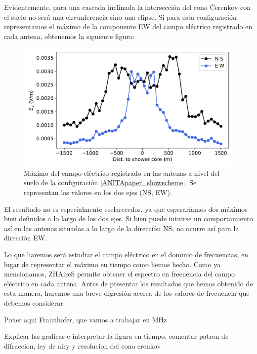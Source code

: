 \documentclass[12 pt, a4paper]{article} %
\numberwithin{equation}{section}
\numberwithin{figure}{section}
\begin{document}
Evidentemente, para una cascada inclinada la intersección del cono \v{C}erenkov con el suelo no será una circunferencia sino una elipse. Si para esta configuración representamos el máximo de la componente EW del campo eléctrico registrado en cada antena, obtenemos la siguiente figura:
\begin{figure}[H]
	\centering
	\includegraphics[width=.65\linewidth]{figures/radio/downgoing_p_10EeV_70deg_Ey_t_ground}
	\caption{Máximo del campo eléctrico registrado en las antenas a nivel del suelo de la configuración \ref{ANITApaper_showscheme}. Se representan los valores en los dos ejes (NS, EW).}
	\label{downgoing_p_10EeV_70deg_Ey_t_ground}
\end{figure}
El resultado no es especialmente esclarecedor, ya que esperaríamos dos máximos bien definidos a lo largo de los dos ejes. Si bien puede intuirse un comportamiento así en las antenas situadas a lo largo de la dirección NS, no ocurre así para la dirección EW.

Lo que haremos será estudiar el campo eléctrico en el dominio de frecuencias, en lugar de representar el máximo en tiempo como hemos hecho. Como ya mencionamos, ZHAireS permite obtener el espectro en frecuencia del campo eléctrico en cada antena. Antes de presentar los resultados que hemos obtenido de esta manera, haremos una breve digresión acerca de los valores de frecuencia que debemos considerar.

Poner aqui Fraunhofer, que vamos a trabajar en MHz

Explicar las graficas e interpretar la figura en tiempo, comentar patron de difraccion, ley de airy y resolucion del cono erenkov
\end{document}
